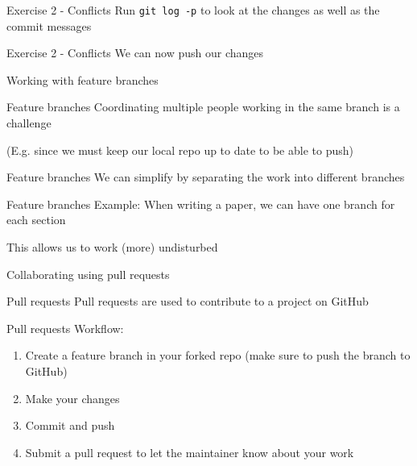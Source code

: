 \documentclass{beamer}
\newcommand{\fmtcmd}[1]{\texttt{#1}}
\begin{document}
\begin{frame}{Exercise 2 - Conflicts}
  \center
  \huge Run \fmtcmd{git log -p} to look at the changes as well as the commit messages
\end{frame}

\begin{frame}{Exercise 2 - Conflicts}
  \center
  \huge We can now push our changes
\end{frame}

\begin{frame}{}
  \center
  \Huge Working with feature branches
\end{frame}

\begin{frame}{Feature branches}
  \center
  \huge Coordinating multiple people working in the same branch is a challenge
  \pause

  \Large (E.g. since we must keep our local repo up to date to be able to push)
\end{frame}

\begin{frame}{Feature branches}
  \center
  \Huge We can simplify by separating the work into different branches
\end{frame}

\begin{frame}{Feature branches}
  \center
  \huge Example: When writing a paper, we can have one branch for each section
  \pause

  \LARGE This allows us to work (more) undisturbed
\end{frame}

\begin{frame}{}
  \center
  \Huge Collaborating using pull requests
\end{frame}

\begin{frame}{Pull requests}
  \center
  \huge Pull requests are used to contribute to a project on GitHub
\end{frame}

\begin{frame}{Pull requests}
  Workflow:

  \begin{enumerate}
    \item Create a feature branch in your forked repo (make sure to push
      the branch to GitHub)
    \item Make your changes
    \item Commit and push
    \item Submit a pull request to let the maintainer know about your
      work
  \end{enumerate}
\end{frame}
\end{document}
